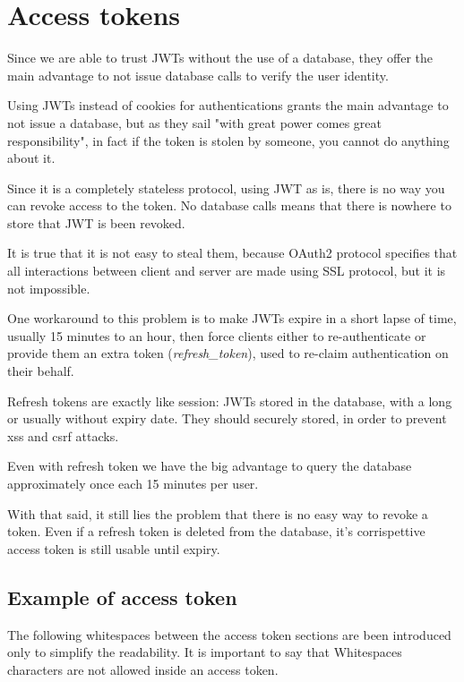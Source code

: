 \section{Access tokens}
Since we are able to trust JWTs  without the use of a database, they offer the
main advantage to not issue database calls to verify the user identity.


Using JWTs instead of cookies for authentications grants the main advantage to
not issue a database, but as they sail "with great power comes great
responsibility", in fact if the token is stolen by someone, you cannot do
anything about it.

Since it is a completely stateless protocol, using JWT as is, there is no way
you can revoke access to the token. No database calls means that there is
nowhere to store that JWT is been revoked.

It is true that it is not easy to steal them, because OAuth2 protocol specifies
that all interactions between client and server are made using SSL protocol, but
it is not impossible.

One workaround to this problem is to make JWTs expire in a short lapse of time,
usually 15 minutes to an hour, then force clients either to re-authenticate or
provide them an extra token (\textit{refresh\_token}), used to re-claim
authentication on their behalf.

Refresh tokens are exactly like session: JWTs stored in the database, with a
long or usually without expiry date.
They should securely stored, in order to prevent \acs{xss} and \acs{csrf} attacks.

Even with refresh token we have the big advantage to query the database
approximately once each 15 minutes per user.

With that said, it still lies the problem that there is no easy way to revoke a
token. Even if a refresh token is deleted from the database, it's corrispettive
access token is still usable until expiry.

\subsection{Example of access token}
The following whitespaces between the access token sections are been introduced
only to simplify the readability.
It is important to say that Whitespaces characters are not allowed inside an
access token.

